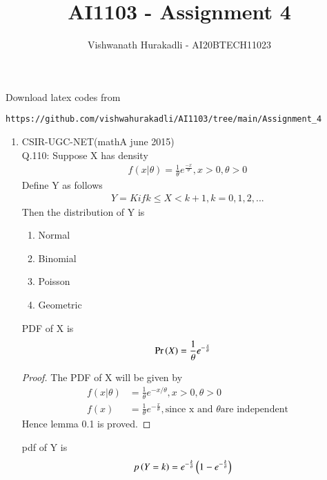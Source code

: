 \documentclass[journal,12pt,twocolumn]{IEEEtran}
\begin{document}
     \def\centbox#1{\makebox[0in]{#1}}
     \def\topbox#1{\raisebox{-\baselineskip}[0in][0in]{#1}}
     \def\midbox#1{\raisebox{-0.5\baselineskip}[0in][0in]{#1}}
\vspace{3cm}
\title{AI1103 - Assignment 4}
\author{Vishwanath Hurakadli - AI20BTECH11023}
\maketitle
\newpage
\bigskip
\renewcommand{\thefigure}{\theenumi}
\renewcommand{\thetable}{\theenumi}
%
Download latex codes from 
%
\begin{lstlisting}
https://github.com/vishwahurakadli/AI1103/tree/main/Assignment_4
\end{lstlisting}
\begin{enumerate}
\item CSIR-UGC-NET(mathA june 2015) \\
Q.110: Suppose X has density
\begin{align}
f(x|\theta)= \frac{1}{\theta}e^{\frac{-x}{\theta}} , x>0,  \theta >0
\end{align}
Define Y as follows
\begin{align}
Y = K if k \leqslant X < k+1, k= 0,1,2,... 
\end{align}
Then the distribution of Y is
\begin{enumerate}
\item Normal 
\item Binomial 
\item Poisson 
\item Geometric
\end{enumerate}
\begin{lemma}
PDF of X is 
\begin{align}
\Pr\left(X\right)&=\frac{1}{\theta} e^{-\frac{x}{\theta}}
\end{align}
\end{lemma}
\begin{proof}
The PDF of X will be given by
\begin{align}
f(x|\theta)&=\frac{1}{\theta} e^{-x/\theta},x>0,\theta >0\\
f(x)&=\frac{1}{\theta}e^{-\frac{x}{\theta}},  \text{since x and }\theta \text{are independent} \end{align}
Hence lemma 0.1 is proved.
\end{proof}
\begin{lemma}
pdf of Y is 
\begin{align}
p\brak{Y=k}&=e^{-\frac{k}{\theta}} \brak{1-e^{-\frac{k}{\theta}}}

\end{align}
\end{lemma}
\end{enumerate}
\end{document}
